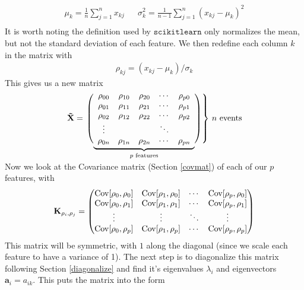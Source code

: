 \begin{align}
\mu_k = \frac{1}{n}\sum_{j=1}^n x_{kj} && \sigma_k^2 = \frac{1}{n-1}\sum_{j=1}^n (x_{kj}-\mu_k)^2 \\
\end{align}
It is worth noting the definition used by $\texttt{scikitlearn}$ only normalizes the mean, but not the standard deviation of each feature. We then redefine each column $k$ in the matrix with
\begin{align}
	\rho_{kj} = (x_{kj} - \mu_k)/\sigma_k
\end{align}
This gives us a new matrix
$$\mathbf{\tilde{X}} =  \left.\left( 
                  \vphantom{\begin{array}{c}1\\1\\1\\1\\1\end{array}}
                  \smash{\underbrace{
                      \begin{array}{ccccc}
                             \rho_{00}&\rho_{10}&\rho_{20}&\cdots &\rho_{p0}\\
                             \rho_{01}&\rho_{11}&\rho_{21}&\cdots &\rho_{p1}\\
                             \rho_{02}&\rho_{12}&\rho_{22}&\cdots &\rho_{p2}\\
                             \vdots&&&\ddots&\\
                             \rho_{0n}&\rho_{1n}&\rho_{2n}&\cdots &\rho_{pn}
                      \end{array}
                      }_{p\text{ features}}}
              \right)\right\}
              \,n\text{ events}
$$\\

Now we look at the Covariance matrix (Section \ref{covmat}) of each of our $p$ features, with
\begin{align}
\textbf{K}_{\rho_i,\rho_j} = \begin{pmatrix} 
                             \mathrm{Cov}[\rho_0,\rho_0]&\mathrm{Cov}[\rho_1,\rho_0]&\cdots &\mathrm{Cov}[\rho_p,\rho_0]\\
                             \mathrm{Cov}[\rho_0,\rho_1]&\mathrm{Cov}[\rho_1,\rho_1]&\cdots &\mathrm{Cov}[\rho_p,\rho_1]\\
                             \vdots&\vdots&\ddots&\vdots\\
                             \mathrm{Cov}[\rho_0,\rho_p]&\mathrm{Cov}[\rho_1,\rho_p]&\cdots &\mathrm{Cov}[\rho_p,\rho_p] \end{pmatrix}
\end{align}
This matrix will be symmetric, with $1$ along the diagonal (since we scale each feature to have a variance of 1). The next step is to diagonalize this matrix following Section \ref{diagonalize} and find it's eigenvalues $\lambda_i$ and eigenvectors $\textbf{a}_i = a_{ik}$. This puts the matrix into the form

